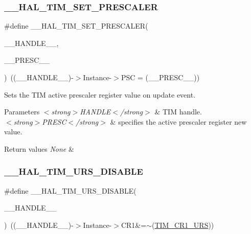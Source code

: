 \subsubsection{\texorpdfstring{\+\_\+\+\_\+\+H\+A\+L\+\_\+\+T\+I\+M\+\_\+\+S\+E\+T\+\_\+\+P\+R\+E\+S\+C\+A\+L\+ER}{\_\_HAL\_TIM\_SET\_PRESCALER}}
{\footnotesize\ttfamily \#define \+\_\+\+\_\+\+H\+A\+L\+\_\+\+T\+I\+M\+\_\+\+S\+E\+T\+\_\+\+P\+R\+E\+S\+C\+A\+L\+ER(\begin{DoxyParamCaption}\item[{}]{\+\_\+\+\_\+\+H\+A\+N\+D\+L\+E\+\_\+\+\_\+,  }\item[{}]{\+\_\+\+\_\+\+P\+R\+E\+S\+C\+\_\+\+\_\+ }\end{DoxyParamCaption})~((\+\_\+\+\_\+\+H\+A\+N\+D\+L\+E\+\_\+\+\_\+)-\/$>$Instance-\/$>$P\+SC = (\+\_\+\+\_\+\+P\+R\+E\+S\+C\+\_\+\+\_\+))}



Sets the T\+IM active prescaler register value on update event. 


\begin{DoxyParams}{Parameters}
{\em $<$strong$>$\+H\+A\+N\+D\+L\+E$<$/strong$>$} & T\+IM handle. \\
\hline
{\em $<$strong$>$\+P\+R\+E\+S\+C$<$/strong$>$} & specifies the active prescaler register new value. \\
\hline
\end{DoxyParams}

\begin{DoxyRetVals}{Return values}
{\em None} & \\
\hline
\end{DoxyRetVals}
\mbox{\label{group___t_i_m___exported___macros_gafacb551a4c537e62a0fe740b2f12236c}} 
\subsubsection{\texorpdfstring{\+\_\+\+\_\+\+H\+A\+L\+\_\+\+T\+I\+M\+\_\+\+U\+R\+S\+\_\+\+D\+I\+S\+A\+B\+LE}{\_\_HAL\_TIM\_URS\_DISABLE}}
{\footnotesize\ttfamily \#define \+\_\+\+\_\+\+H\+A\+L\+\_\+\+T\+I\+M\+\_\+\+U\+R\+S\+\_\+\+D\+I\+S\+A\+B\+LE(\begin{DoxyParamCaption}\item[{}]{\+\_\+\+\_\+\+H\+A\+N\+D\+L\+E\+\_\+\+\_\+ }\end{DoxyParamCaption})~((\+\_\+\+\_\+\+H\+A\+N\+D\+L\+E\+\_\+\+\_\+)-\/$>$Instance-\/$>$C\+R1\&=$\sim$(\hyperlink{group___peripheral___registers___bits___definition_ga06c997c2c23e8bef7ca07579762c113b}{T\+I\+M\+\_\+\+C\+R1\+\_\+\+U\+RS}))}



